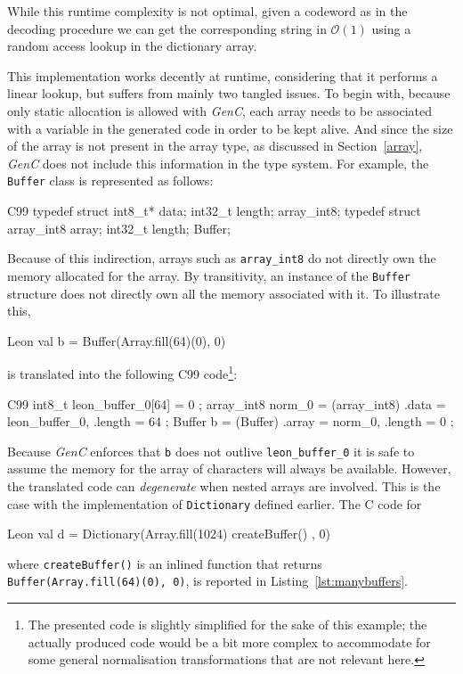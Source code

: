 \documentclass[a4paper,twoside]{article}
\newcommand{\InlineC}[1]{\lstinline[language=C99]|#1|}
\newcommand{\InlineS}[1]{\lstinline[language=Leon]|#1|}
\newcommand{\GenC}{\emph{GenC}\xspace}
\newcommand{\RefSec}[1]{Section~\ref{#1}}
\newcommand{\RefCode}[1]{Listing~\ref{#1}}
\newcommand{\BigO}[1]{\mathcal{O}(#1)}
\begin{document}
While this runtime complexity is not optimal, given a codeword as in the
decoding procedure we can get the corresponding string in $\BigO{1}$ using a
random access lookup in the dictionary array.

This implementation works decently at runtime, considering that it performs a
linear lookup, but suffers from mainly two tangled issues. To begin with,
because only static allocation is allowed with \GenC, each array needs to be
associated with a variable in the generated code in order to be kept alive. And
since the size of the array is not present in the array type, as discussed in
\RefSec{array}, \GenC does not include this information in the type system. For
example, the \InlineS{Buffer} class is represented as follows:
\begin{ShortCode}{C99}
typedef struct { int8_t* data; int32_t length; } array_int8;
typedef struct { array_int8 array; int32_t length; } Buffer;
\end{ShortCode}

Because of this indirection, arrays such as \InlineC{array_int8} do not directly
own the memory allocated for the array. By transitivity, an instance of the
\InlineC{Buffer} structure does not directly own all the memory associated with
it. To illustrate this,
\begin{ShortCode}{Leon}
val b = Buffer(Array.fill(64)(0), 0)
\end{ShortCode}
is translated into the following C99 code\footnote{The presented code is
slightly simplified for the sake of this example; the actually produced code
would be a bit more complex to accommodate for some general normalisation
transformations that are not relevant here.}:
\begin{ShortCode}{C99}
int8_t leon_buffer_0[64] = { 0 };
array_int8 norm_0 = (array_int8) { .data = leon_buffer_0, .length = 64 };
Buffer b = (Buffer) { .array = norm_0, .length = 0 };
\end{ShortCode}

Because \GenC enforces that \InlineC{b} does not outlive \InlineC{leon_buffer_0}
it is safe to assume the memory for the array of characters will always be
available. However, the translated code can \emph{degenerate} when nested arrays
are involved. This is the case with the implementation of \InlineS{Dictionary}
defined earlier. The C code for
\begin{ShortCode}{Leon}
val d = Dictionary(Array.fill(1024){ createBuffer() }, 0)
\end{ShortCode}
where \InlineS{createBuffer()} is an inlined function that returns
\InlineS{Buffer(Array.fill(64)(0), 0)}, is reported in
\RefCode{lst:manybuffers}.
\end{document}
